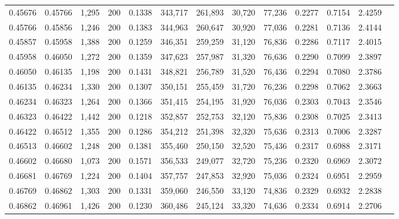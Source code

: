\begin{tabular}{rrrrrrrrrrrrr}
0.45676 & 0.45766 & 1,295 & 200 &                                     0.1338 & 343,717 & 261,893 &  30,720 &  77,236 & 0.2277 & 0.7154 & 2.4259 \\
0.45766 & 0.45856 & 1,246 & 200 &                                     0.1383 & 344,963 & 260,647 &  30,920 &  77,036 & 0.2281 & 0.7136 & 2.4144 \\
0.45857 & 0.45958 & 1,388 & 200 &                                     0.1259 & 346,351 & 259,259 &  31,120 &  76,836 & 0.2286 & 0.7117 & 2.4015 \\
0.45958 & 0.46050 & 1,272 & 200 &                                     0.1359 & 347,623 & 257,987 &  31,320 &  76,636 & 0.2290 & 0.7099 & 2.3897 \\
0.46050 & 0.46135 & 1,198 & 200 &                                     0.1431 & 348,821 & 256,789 &  31,520 &  76,436 & 0.2294 & 0.7080 & 2.3786 \\
0.46135 & 0.46234 & 1,330 & 200 &                                     0.1307 & 350,151 & 255,459 &  31,720 &  76,236 & 0.2298 & 0.7062 & 2.3663 \\
0.46234 & 0.46323 & 1,264 & 200 &                                     0.1366 & 351,415 & 254,195 &  31,920 &  76,036 & 0.2303 & 0.7043 & 2.3546 \\
0.46323 & 0.46422 & 1,442 & 200 &                                     0.1218 & 352,857 & 252,753 &  32,120 &  75,836 & 0.2308 & 0.7025 & 2.3413 \\
0.46422 & 0.46512 & 1,355 & 200 &                                     0.1286 & 354,212 & 251,398 &  32,320 &  75,636 & 0.2313 & 0.7006 & 2.3287 \\
0.46513 & 0.46602 & 1,248 & 200 &                                     0.1381 & 355,460 & 250,150 &  32,520 &  75,436 & 0.2317 & 0.6988 & 2.3171 \\
0.46602 & 0.46680 & 1,073 & 200 &                                     0.1571 & 356,533 & 249,077 &  32,720 &  75,236 & 0.2320 & 0.6969 & 2.3072 \\
0.46681 & 0.46769 & 1,224 & 200 &                                     0.1404 & 357,757 & 247,853 &  32,920 &  75,036 & 0.2324 & 0.6951 & 2.2959 \\
0.46769 & 0.46862 & 1,303 & 200 &                                     0.1331 & 359,060 & 246,550 &  33,120 &  74,836 & 0.2329 & 0.6932 & 2.2838 \\
0.46862 & 0.46961 & 1,426 & 200 &                                     0.1230 & 360,486 & 245,124 &  33,320 &  74,636 & 0.2334 & 0.6914 & 2.2706 \\

\end{tabular}

